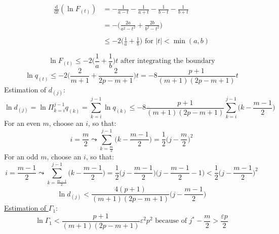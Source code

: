 \begin{equation}
	\begin{array}{ll}
	\frac{ \mathrm{d} }{ \mathrm{d}t } (\ln F_{ (t) })
	& = -\frac{1}{ a - t } -\frac{1}{ a + t }
		-\frac{1}{ b - t }-\frac{1}{ b + t } \\\\
	& = -\Big( \frac{ 2a }{ a^2 - t^2 } + \frac{ 2b }{ b^2 - t^2 }
		\Big) \\\\
	& \leq -2\Big( \frac{1}{a} + \frac{1}{b} \Big)
	\textrm{ for } |t| < \min(a,b)	\\\\
	\end{array}
\end{equation}
\begin{equation}
	\ln F_{ (t) } \leq -2\Big( \frac{1}{a} + \frac{1}{b} \Big) t
	\textrm{ after integrating the boundary}
\end{equation}
\begin{equation}
	\ln q_{ (t) } \leq -2\Bigg( \frac{ 2 }{ m + 1 } 
		+ \frac{ 2 }{ 2p - m + 1 } \Big) t
	= -8 \frac{ p + 1 }{ (m + 1)(2p - m + 1) }t
\end{equation}
Estimation of $d_{(j)}$:
\begin{equation}
	\ln d_{(j)} = \ln \Pi_{ k = i }^{j - 1} q_{ (k) }
	= \sum_{ k = i }^{j - 1} \ln q_{ (k) }
	\leq -8 \frac{ p + 1 }{ (m + 1)(2p - m + 1) } \sum_{ k = i }^{j - 1}
		\Big( k - \frac{ m - 1 }{2} \Big)
\end{equation}
For an even $m$, choose an $i$, so that:
\begin{equation}
	i = \frac{m}{2} \leadsto \sum_{ k = \frac{m}{2} }^{j - 1}
		\Bigg( k - \frac{ m - 1 }{2} \Bigg)
		= \frac{1}{2} \Bigg( j - \frac{m}{2} \Bigg)^2
\end{equation}
For an odd $m$, choose an $i$, so that:
\begin{equation}
	i = \frac{ m - 1 }{2} \leadsto \sum_{ k = \frac{ m - 1 }{2} }^{j - 1}
		\Bigg( k - \frac{ m - 1 }{2} \Bigg)
		= \frac{1}{2} \Bigg( j - \frac{ m - 1 }{2} \Bigg)
			\Bigg( j - \frac{ m - 1 }{2} - 1 \Bigg)
		< \frac{1}{2} \Bigg( j - \frac{ m - 1 }{2} \Bigg)^2
\end{equation}
\begin{equation}
	\ln d_{ (j) } < \frac{ 4 (p + 1) }{ (m + 1)(2p - m + 1) }
		\Bigg( j - \frac{ m - 1 }{2} \Bigg)
\end{equation}
\underline{Estimation of $\Gamma_1$}:
\begin{equation}
	\ln \Gamma_1 < \frac{ p + 1 }{ (m + 1)(2p - m + 1) } \varepsilon^2 p^2
	\textrm{ because of } j^* - \frac{ m }{ 2 } > \frac{\varepsilon p}{2}
\end{equation}
